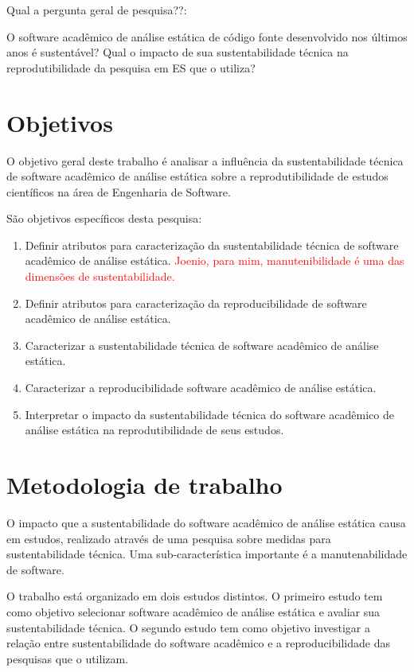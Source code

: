 Qual a pergunta geral de pesquisa??:

O software acadêmico de análise estática de código fonte desenvolvido nos últimos anos é sustentável? Qual o impacto de sua sustentabilidade técnica na reprodutibilidade da pesquisa em ES que o utiliza?

\section{Objetivos}

O objetivo geral deste trabalho é analisar a influência da sustentabilidade técnica de software acadêmico de análise estática sobre a reprodutibilidade de estudos científicos na área de Engenharia de Software.

São objetivos específicos desta pesquisa:

\begin{enumerate}
  \item Definir atributos para caracterização da sustentabilidade técnica de software acadêmico de análise estática. \textcolor{red}{Joenio, para mim, manutenibilidade é uma das dimensões de sustentabilidade.}
  \item Definir atributos para caracterização da reproducibilidade de software acadêmico de análise estática.
  \item Caracterizar a sustentabilidade técnica de software acadêmico  de análise estática.
  \item Caracterizar a reproducibilidade software acadêmico  de análise estática.
  \item Interpretar o impacto da sustentabilidade técnica do software acadêmico de análise estática na reprodutibilidade de seus estudos.
\end{enumerate}

\section{Metodologia de trabalho}

O impacto que a sustentabilidade do
software acadêmico de análise estática causa em estudos, realizado através de uma pesquisa sobre medidas para sustentabilidade técnica. Uma sub-característica importante é a manutenabilidade de software.

O trabalho está organizado em dois estudos distintos.
O primeiro estudo tem como objetivo selecionar software  acadêmico  de análise estática e avaliar sua sustentabilidade técnica. 
O segundo estudo tem como objetivo investigar a relação entre sustentabilidade do software acadêmico e a reproducibilidade das pesquisas que o utilizam.

